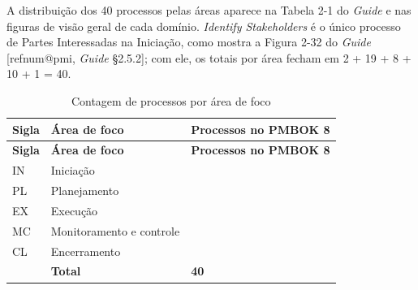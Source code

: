 \documentclass[12pt,a4paper,article,oneside,english,brazil]{abntex2}
\makeatletter
\newcommand{\fontetab}[1]{\par\vspace{3pt}{\small\noindent Fonte: #1\par}}
\newcommand{\refnum}[1]{\csname refnum@#1\endcsname}
\newcommand{\cit}[1]{[\refnum{#1}]}
\makeatother
\begin{document}
A distribuição dos 40 processos pelas áreas aparece na Tabela 2-1 do \textit{Guide} e nas figuras de visão geral de cada domínio. \textit{Identify Stakeholders} é o único processo de Partes Interessadas na Iniciação, como mostra a Figura 2-32 do \textit{Guide} [\refnum{pmi}, \textit{Guide} §2.5.2]; com ele, os totais por área fecham em 2 + 19 + 8 + 10 + 1 = 40.

\begingroup\SingleSpacing\small
\begin{longtable}{@{}>{\raggedright\arraybackslash}p{1.6cm}>{\raggedright\arraybackslash}p{6.4cm}>{\centering\arraybackslash}p{3.2cm}@{}}
\caption{Contagem de processos por área de foco}\label{tab:t7}\\
\hline
\textbf{Sigla} & \textbf{Área de foco} & \textbf{Processos no PMBOK 8}\\
\hline
\endfirsthead
\hline
\textbf{Sigla} & \textbf{Área de foco} & \textbf{Processos no PMBOK 8}\\
\hline
\endhead
\hline
\endfoot
\hline
\endlastfoot
IN & Iniciação & 2\\[3pt]
PL & Planejamento & 19\\[3pt]
EX & Execução & 8\\[3pt]
MC & Monitoramento e controle & 10\\[3pt]
CL & Encerramento & 1\\[3pt]
\hline
 & \textbf{Total} & \textbf{40}\\[3pt]
\end{longtable}
\endgroup
\fontetab{Elaborado pelos autores (2026), a partir de \cit{pmi}.}
\end{document}
